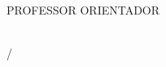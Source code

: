 
\begin{titlepage}
\begin{center}

\Institution\\
\Course\\
\Pretitle\\
\vfill

\textbf{\Title}\\
\vfill

\AUTHOR\\
\vfill

PROFESSOR ORIENTADOR\\
\Counselor\\
\vfill

\begin{espacosimples}
\AddressOfPublishing/\YearOfPublising
\\
\end{espacosimples}

\end{center}
\end{titlepage}

